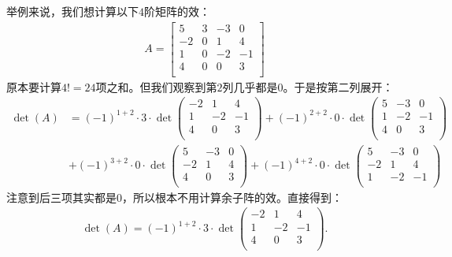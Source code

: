 \documentclass[12pt,UTF8]{ctexbook}
\begin{document}
举例来说，我们想计算以下$4$阶矩阵的效：
\begin{align*}
    A = \begin{bmatrix}
        5    & 3  & -3 & 0 \\
        -2   & 0   & 1 & 4 \\
        1     & 0    & -2 & -1  \\
        4    & 0   & 0 & 3 \\
       \end{bmatrix}
\end{align*}
原本要计算$4!= 24$项之和。但我们观察到第$2$列几乎都是$0$。于是按第二列展开：
\begin{align*}
    \det(A) &= (-1)^{1+2} \cdot 3\cdot \det\begin{pmatrix}
        -2      & 1 & 4 \\
        1        & -2 & -1  \\
        4       & 0 & 3 \\
       \end{pmatrix}
       + (-1)^{2+2} \cdot 0\cdot \det\begin{pmatrix}
        5     & -3 & 0 \\
        1    & -2 & -1  \\
        4    & 0 & 3 \\
       \end{pmatrix}
       \\
       &+ (-1)^{3+2} \cdot 0\cdot \det\begin{pmatrix}
        5     & -3 & 0 \\
        -2    & 1 & 4 \\
        4    & 0 & 3 \\
       \end{pmatrix}+ (-1)^{4+2} \cdot 0\cdot \det\begin{pmatrix}
        5    & -3 & 0 \\
        -2    & 1 & 4 \\
        1    & -2 & -1  \\
       \end{pmatrix}
\end{align*}
注意到后三项其实都是$0$，所以根本不用计算余子阵的效。直接得到：
\begin{align*}
    \det(A) = (-1)^{1+2} \cdot 3\cdot \det\begin{pmatrix}
        -2      & 1 & 4 \\
        1        & -2 & -1  \\
        4       & 0 & 3 \\
       \end{pmatrix}.
\end{align*}
\end{document}
